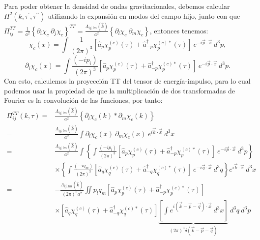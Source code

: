 Para poder obtener la densidad de ondas gravitacionales, debemos calcular $\Pi^2 \left( k, \tau^\prime, \tau^{\prime \prime} \right)$ utilizando la expansión en modos del campo hijo, junto con que $\displaystyle \Pi_{ij}^{TT} = \frac{1}{a^2} \left\{ \partial_i \chi_c ~ \partial_j \chi_c \right\}^{TT} = \frac{\Lambda_{ij,lm} \left( \hat{k} \right)}{a^2} \left\{ \partial_l \chi_c ~ \partial_m \chi_c \right\}$, entonces tenemos:
\begin{equation}
    \chi_c (x) = \int \frac{1}{(2 \pi)^3} \left[ \hat{a}_p \chi^{(c)}_p (\tau) + \hat{a}^\dagger_{-p} \chi^{(c) *}_p (\tau) \right] ~ e^{- i \vec{p} \cdot \vec{x}} ~ d^3 p,
\end{equation}
\begin{equation}
    \partial_i \chi_c (x) = \int \frac{(-i p_i)}{(2 \pi)^3} \left[ \hat{a}_p \chi^{(c)}_p (\tau) + \hat{a}^\dagger_{-p} \chi^{(c) *}_p (\tau) \right] ~ e^{- i \vec{p} \cdot \vec{x}} ~ d^3 p.
\end{equation}
Con esto, calculemos la proyección TT del tensor de energía-impulso, para lo cual podemos usar la propiedad de que la multiplicación de dos transformadas de Fourier es la convolución de las funciones, por tanto:
\begin{equation*}
    \begin{split}
        \Pi^{TT}_{ij} (k,\tau) =& \frac{\Lambda_{ij,lm} (\hat{k})}{a^2} \left\{ \partial_l \chi_c (k) * \partial_m \chi_c (k) \right\}\\
        =& \frac{\Lambda_{ij,lm} (\hat{k})}{a^2} \int \partial_l \chi_c (x) ~ \partial_m \chi_c (x) ~ e^{i \vec{k} \cdot \vec{x}} ~ d^3 x\\
        =& \frac{\Lambda_{ij,lm} (\hat{k})}{a^2} \int \left\{ \int \frac{(-i p_l)}{(2 \pi)^3} \left[ \hat{a}_p \chi^{(c)}_p (\tau) + \hat{a}^\dagger_{-p} \chi^{(c) *}_p (\tau) \right] ~ e^{- i \vec{p} \cdot \vec{x}} ~ d^3 p \right\} \\
        & \times \left\{ \int \frac{(-i q_m)}{(2 \pi)^3} \left[ \hat{a}_q \chi^{(c)}_q (\tau) + \hat{a}^\dagger_{-q} \chi^{(c) *}_q (\tau) \right] ~ e^{- i \vec{q} \cdot \vec{x}} ~ d^3 q \right\} e^{i \vec{k} \cdot \vec{x}} ~ d^3 x\\
        =& - \frac{\Lambda_{ij,lm} (\hat{k})}{(2 \pi)^6 a^2} \iint p_l q_m \left[ \hat{a}_p \chi^{(c)}_p (\tau) + \hat{a}^\dagger_{-p} \chi^{(c) *}_p (\tau) \right] \\ 
        & \times \left[ \hat{a}_q \chi^{(c)}_q (\tau) + \hat{a}^\dagger_{-q} \chi^{(c) *}_q (\tau) \right] \underbrace{\left[\int e^{i \left( \vec{k} - \vec{p} - \vec{q} \right) \cdot \vec{x}} ~ d^3 x \right]}_{\displaystyle (2\pi)^3 \delta \left( \vec{k} - \vec{p} - \vec{q} \right)} ~ d^3 q ~ d^3 p
    \end{split}
\end{equation*}
